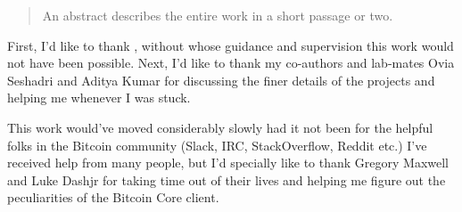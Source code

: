 \documentclass[
12pt, %
oneside, %
english, 
onehalfspacing, %
headsepline, %
]{MastersDoctoralThesis} %
\begin{document}
\makecertificate


\begin{abstract}
\addchaptertocentry{\abstractname}

An abstract describes the entire work in a short passage or two.

\end{abstract}


\begin{acknowledgements}
\addchaptertocentry{\acknowledgementname}
First, I'd like to thank \supname, without whose guidance and supervision this work would not have been possible.
Next, I'd like to thank my co-authors and lab-mates Ovia Seshadri and Aditya Kumar for discussing the finer details of the projects and helping me whenever I was stuck.

This work would've moved considerably slowly had it not been for the helpful folks in the Bitcoin community (Slack, IRC, StackOverflow, Reddit etc.)
I've received help from many people, but I'd specially like to thank Gregory Maxwell and Luke Dashjr for taking time out of their lives and helping me figure out the peculiarities of the Bitcoin Core client.
\end{acknowledgements}


\tableofcontents

\listoffigures


\mainmatter

\pagestyle{thesis}

\end{document}
